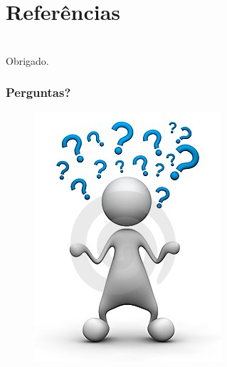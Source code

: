 \documentclass{beamer}
\begin{document}
\section{Referências}

\nocite{mark21Century,ubiSmartSpace,paulDourish,almeida,buzeto_11,ronaldAzuma,milgram,hirzer,forman}


\section{ }
\begin{frame}
    \frametitle{ }
	\centerline{Obrigado.} 
\end{frame}

\begin{frame}
    \frametitle{Perguntas? }
    \begin{figure}[h]
		\centering \includegraphics[scale=.55]{figuras/perguntas.jpg}
	\end{figure}
\end{frame}
\end{document}
